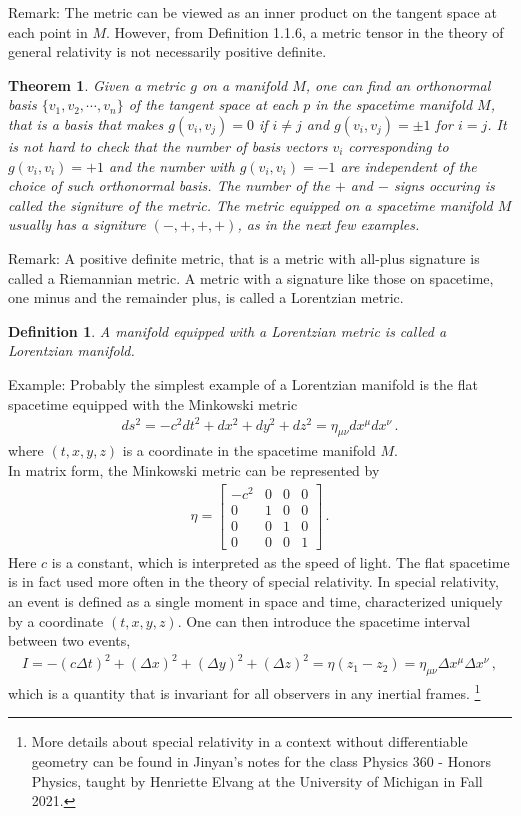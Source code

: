 \documentclass[11pt, onesided]{book}
\theoremstyle{break}
\theoremstyle{break}
\newtheorem{thm}{Theorem}[section]
\newtheorem{defn}{Definition}[thm]
\newcommand{\bmat}[1]{\begin{bmatrix} #1 \end{bmatrix}}
\newcommand{\remark}{\color{blue}Remark: \color{black}}
\newcommand{\example}{\color{green}Example: \color{black}}
\begin{document}
\remark The metric can be viewed as an inner product on the tangent space at each point in $M$. However, from Definition 1.1.6,  a metric tensor in the theory of general relativity is not necessarily positive definite.\\

\begin{thm}
Given a metric $g$ on a manifold $M$, one can find an orthonormal basis $\{v_1,v_2,\cdots, v_n\}$ of the tangent space at each $p$ in the spacetime manifold $M$, that is a basis that makes $g(v_i,v_j) = 0$ if $i\neq j$ and $g(v_i,v_j) = \pm 1$ for $i=j$. It is not hard to check that the number of basis vectors $v_i$ corresponding to $g(v_i,v_i) = +1$ and the number with $g(v_i,v_i) = -1$ are independent of the choice of such orthonormal basis. The number of the $+$ and $-$ signs occuring is called the \textit{signiture} of the metric. The metric equipped on a spacetime manifold $M$ usually has a signiture $(-,+,+,+)$, as in the next few examples. 
\end{thm}



\remark A positive definite metric, that is a metric with all-plus signature is called a Riemannian metric. A metric with a signature like those on spacetime, one minus and the remainder plus, is called a Lorentzian metric.

\begin{defn}
A manifold equipped with a Lorentzian metric is called a Lorentzian manifold.  
\end{defn}

\example Probably the simplest example of a Lorentzian manifold is the flat spacetime equipped with the Minkowski metric
\begin{align}
ds^2 = -c^2dt^2 + dx^2 + dy^2 + dz^2 = \eta_{\mu\nu} dx^{\mu}dx^\nu\,.
\end{align}
where $(t,x,y,z)$ is a coordinate in the spacetime manifold $M$. \\
In matrix form, the Minkowski metric can be represented by 
\begin{align*}
\eta = \bmat{-c^2 & 0 & 0 & 0\\
0 & 1 & 0 & 0\\
0 & 0 & 1 & 0\\
0 & 0 & 0 & 1}\, .
\end{align*}
Here $c$ is a constant, which is interpreted as the speed of light. The flat spacetime is in fact used more often in the theory of special relativity. In special relativity, an event is defined as a single moment in space and time, characterized uniquely by a coordinate $(t,x,y,z)$. One can then introduce the spacetime interval between two events,
\begin{align*}
I = -(c\Delta t)^2 + (\Delta x)^2 + (\Delta y)^2 + (\Delta z)^2 = \eta(z_1-z_2) = \eta_{\mu\nu}\Delta x^{\mu}\Delta x^{\nu}\, ,
\end{align*}
which is a quantity that is invariant for all observers in any inertial frames. \footnote{More details about special relativity in a context without differentiable geometry can be found in Jinyan's notes for the class Physics 360 - Honors Physics, taught by Henriette Elvang at the University of Michigan in Fall 2021.}\\
\end{document}
